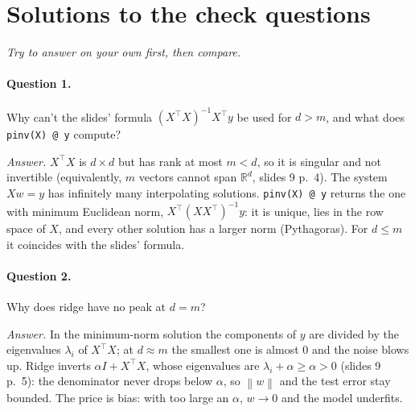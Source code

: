 \documentclass[11pt,a4paper]{article}
\newcommand{\R}{\mathbb{R}}
\newcommand{\norm}[1]{\left\lVert #1 \right\rVert}
\begin{document}
\section{Solutions to the check questions}
\emph{Try to answer on your own first, then compare.}

\paragraph{Question 1.} Why can't the slides' formula $(X^\top X)^{-1}X^\top y$ be used for $d > m$, and what does \texttt{pinv(X) @ y} compute?

\smallskip
\noindent\textit{Answer.} $X^\top X$ is $d\times d$ but has rank at most $m < d$, so it is singular and not invertible
(equivalently, $m$ vectors cannot span $\R^d$, slides 9 p.~4). The system $Xw = y$ has infinitely many interpolating
solutions. \texttt{pinv(X) @ y} returns the one with minimum Euclidean norm, $X^\top(XX^\top)^{-1}y$: it is unique, lies in
the row space of $X$, and every other solution has a larger norm (Pythagoras). For $d \le m$ it coincides with the slides' formula.

\paragraph{Question 2.} Why does ridge have no peak at $d = m$?

\smallskip
\noindent\textit{Answer.} In the minimum-norm solution the components of $y$ are divided by the eigenvalues $\lambda_i$ of
$X^\top X$; at $d \approx m$ the smallest one is almost $0$ and the noise blows up. Ridge inverts $\alpha I + X^\top X$, whose
eigenvalues are $\lambda_i + \alpha \ge \alpha > 0$ (slides 9 p.~5): the denominator never drops below $\alpha$, so $\norm{w}$
and the test error stay bounded. The price is bias: with too large an $\alpha$, $w \to 0$ and the model underfits.

\end{document}
